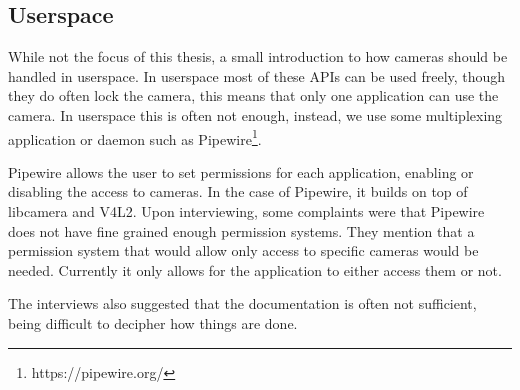 \subsection{Userspace}\label{section:userspace}
While not the focus of this thesis, a small introduction to how cameras should
be handled in userspace. In userspace most of these APIs can be used freely,
though they do often lock the camera, this means that only one application can
use the camera. In userspace this is often not enough, instead, we use some
multiplexing application or daemon such as Pipewire\footnote{https://pipewire.org/}.

Pipewire allows the user to set permissions for each application, enabling or
disabling the access to cameras. In the case of Pipewire, it builds on top of
libcamera and V4L2. Upon interviewing, some complaints were that Pipewire does
not have fine grained enough permission systems. They mention that a permission
system that would allow only access to specific cameras would be needed.
Currently it only allows for the application to either access them or not.

The interviews also suggested that the documentation is often not sufficient,
being difficult to decipher how things are done.

